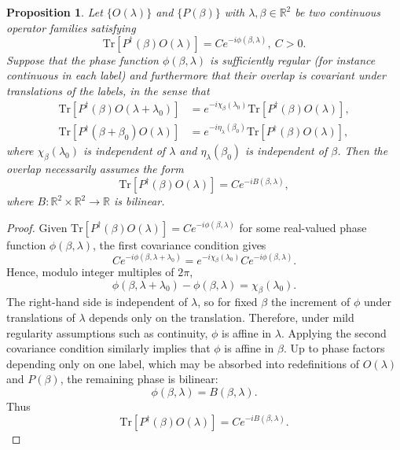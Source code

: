 \documentclass[10pt,a4paper]{amsart}
\newtheorem{prop}{Proposition}
\begin{document}
\begin{prop}
Let $\{O(\lambda)\}$ and
$\{P(\beta)\}$ with $\lambda,\beta\in\mathbb R^2$ be two continuous operator families satisfying
\[
\mathrm{Tr}\!\left[P^\dagger(\beta)O(\lambda)\right]
=
Ce^{-i\phi(\beta,\lambda)},
~ C>0.
\]
Suppose that the phase function
$\phi(\beta,\lambda)$ is sufficiently regular (for instance
continuous in each label) and furthermore that their overlap is covariant under translations of
the labels, in the sense that
\begin{align}
\mathrm{Tr}\!\left[P^\dagger(\beta)O(\lambda+\lambda_0)\right]
&=
e^{-i\chi_\beta(\lambda_0)}
\mathrm{Tr}\!\left[P^\dagger(\beta)O(\lambda)\right],\\
\mathrm{Tr}\!\left[P^\dagger(\beta+\beta_0)O(\lambda)\right]
&=
e^{-i\eta_\lambda(\beta_0)}
\mathrm{Tr}\!\left[P^\dagger(\beta)O(\lambda)\right],
\end{align}
where \(\chi_\beta(\lambda_0)\) is independent of
\(\lambda\) and \(\eta_\lambda(\beta_0)\) is independent
of \(\beta\). Then the overlap necessarily assumes the form
\[
\mathrm{Tr}[P^\dagger(\beta)O(\lambda)]
=
Ce^{-iB(\beta,\lambda)},
\]
where \(B:\mathbb R^2\times\mathbb R^2\to\mathbb R\)
is bilinear.
\end{prop}

\begin{proof}
Given $\mathrm{Tr}\!\left[P^\dagger(\beta)O(\lambda)\right]
=
C e^{-i\phi(\beta,\lambda)}$ for some real-valued phase function $\phi(\beta,\lambda)$, the first covariance condition gives
\begin{equation}
C e^{-i\phi(\beta,\lambda+\lambda_0)}
=
e^{-i\chi_\beta(\lambda_0)}
C e^{-i\phi(\beta,\lambda)}.
\end{equation}
Hence, modulo integer multiples of $2\pi$,
\begin{equation}
\phi(\beta,\lambda+\lambda_0)-\phi(\beta,\lambda)
=
\chi_\beta(\lambda_0).
\end{equation}
The right-hand side is independent of $\lambda$, so for fixed $\beta$ the
increment of $\phi$ under translations of $\lambda$ depends only on the
translation. Therefore, under mild regularity assumptions such as continuity, $\phi$ is affine in $\lambda$.
Applying the second covariance condition similarly implies that $\phi$ is
affine in $\beta$. Up to phase factors depending only on one label, which may
be absorbed into redefinitions of $O(\lambda)$ and $P(\beta)$, the remaining
phase is bilinear:
\begin{equation}
\phi(\beta,\lambda)=B(\beta,\lambda).
\end{equation}
Thus
\begin{equation}
\mathrm{Tr}\!\left[P^\dagger(\beta)O(\lambda)\right]
=
C e^{-iB(\beta,\lambda)}.
\end{equation}
\end{proof}
\end{document}
